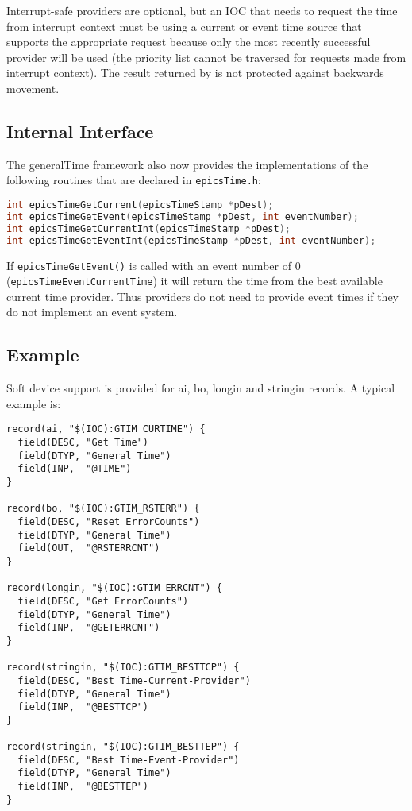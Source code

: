 Interrupt-safe providers are optional, but an IOC that needs to request the time from interrupt context must be using a current or event time source that supports the appropriate request because only the most recently successful provider will 
be used (the priority list cannot be traversed for requests made from interrupt context).
The result returned by is not protected against backwards movement.

\subsection{Internal Interface}

The generalTime framework also now provides the implementations of the following routines that are declared in \verb|epicsTime.h|:

\begin{lstlisting}[language=C]
int epicsTimeGetCurrent(epicsTimeStamp *pDest);
int epicsTimeGetEvent(epicsTimeStamp *pDest, int eventNumber);
int epicsTimeGetCurrentInt(epicsTimeStamp *pDest);
int epicsTimeGetEventInt(epicsTimeStamp *pDest, int eventNumber);
\end{lstlisting}

If \verb|epicsTimeGetEvent()| is called with an event number of 0 (\verb|epicsTimeEventCurrentTime|) it will return the time from the best available current time provider.
Thus providers do not need to provide event times if they do not implement an event system.

\subsection{Example}

Soft device support is provided for ai, bo, longin and stringin records.
A typical example is:

\begin{verbatim}
record(ai, "$(IOC):GTIM_CURTIME") {
  field(DESC, "Get Time")
  field(DTYP, "General Time")
  field(INP,  "@TIME")
}

record(bo, "$(IOC):GTIM_RSTERR") {
  field(DESC, "Reset ErrorCounts")
  field(DTYP, "General Time")
  field(OUT,  "@RSTERRCNT")
}

record(longin, "$(IOC):GTIM_ERRCNT") {
  field(DESC, "Get ErrorCounts")
  field(DTYP, "General Time")
  field(INP,  "@GETERRCNT")
}

record(stringin, "$(IOC):GTIM_BESTTCP") {
  field(DESC, "Best Time-Current-Provider")
  field(DTYP, "General Time")
  field(INP,  "@BESTTCP")
}

record(stringin, "$(IOC):GTIM_BESTTEP") {
  field(DESC, "Best Time-Event-Provider")
  field(DTYP, "General Time")
  field(INP,  "@BESTTEP")
}
\end{verbatim}

